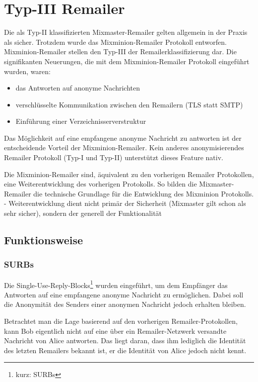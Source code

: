 \chapter{Typ-III Remailer}
Die als Typ-II klassifizierten Mixmaster-Remailer gelten allgemein in der Praxis als sicher. Trotzdem wurde das Mixminion-Remailer Protokoll entworfen. Mixminion-Remailer stellen den Typ-III der Remailerklassifizierung dar. Die signifikanten Neuerungen, die mit dem Mixminion-Remailer Protokoll eingeführt wurden, waren:
\begin{itemize}
\item das Antworten auf anonyme Nachrichten
\item verschlüsselte Kommunikation zwischen den Remailern (TLS statt SMTP)
\item Einführung einer Verzeichnisserverstruktur
\end{itemize}

Das Möglichkeit auf eine empfangene anonyme Nachricht zu antworten ist der entscheidende Vorteil der Mixminion-Remailer. Kein anderes anonymisierendes Remailer Protokoll (Typ-I und Typ-II) unterstützt dieses Feature nativ.

Die Mixminion-Remailer sind, äquivalent zu den vorherigen Remailer Protokollen, eine Weiterentwicklung des vorherigen Protokolls. So bilden die Mixmaster-Remailer die technische Grundlage für die Entwicklung des Mixminion Protokolls.
- Weiterentwicklung dient nicht primär der Sicherheit (Mixmaster gilt schon als sehr sicher), sondern der generell der Funktionalität


\section{Funktionsweise}
\subsection{SURBs}
Die Single-Use-Reply-Blocks\footnote{kurz: SURBs} wurden eingeführt, um dem Empfänger das Antworten auf eine empfangene anonyme Nachricht zu ermöglichen. Dabei soll die Anonymität des  Senders einer anonymen Nachricht jedoch erhalten bleiben.

Betrachtet man die Lage basierend auf den vorherigen Remailer-Protokollen, kann Bob eigentlich nicht auf eine über ein Remailer-Netzwerk versandte Nachricht von Alice antworten. Das liegt daran, dass ihm lediglich die Identität des letzten Remailers bekannt ist, er die Identität von Alice jedoch nicht kennt.

